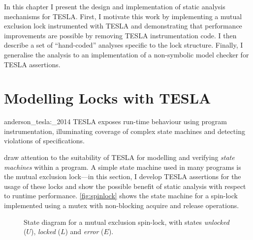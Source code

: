 In this chapter I present the design and implementation of static analysis
mechanisms for TESLA. First, I motivate this work by implementing a mutual
exclusion lock instrumented with TESLA and demonstrating that performance
improvements are possible by removing TESLA instrumentation code. I then
describe a set of ``hand-coded'' analyses specific to the lock structure.
Finally, I generalise the analysis to an implementation of a non-symbolic model
checker for TESLA assertions.

\section{Modelling Locks with TESLA} \label{sec:locks}

\begin{displaycquote}[p. 1]{anderson_tesla:_2014}
TESLA exposes run-time behaviour using program instrumentation, illuminating
coverage of complex state machines and detecting violations of specifications.
\end{displaycquote}

\textcite{anderson_tesla:_2014} draw attention to the suitability of TESLA for
modelling and verifying \emph{state machines} within a program. A simple state
machine used in many programs is the mutual exclusion lock---in this section, I
develop TESLA assertions for the usage of these locks and show the possible
benefit of static analysis with respect to runtime performance.
\autoref{fig:spinlock} shows the state machine for a spin-lock implemented using
a mutex with non-blocking acquire and release operations.

\begin{figure}
  \centering
  \caption{State diagram for a mutual exclusion spin-lock, with states
  \emph{unlocked} ($U$), \emph{locked} ($L$) and \emph{error} ($E$).}
  \label{fig:spinlock}
\end{figure}

